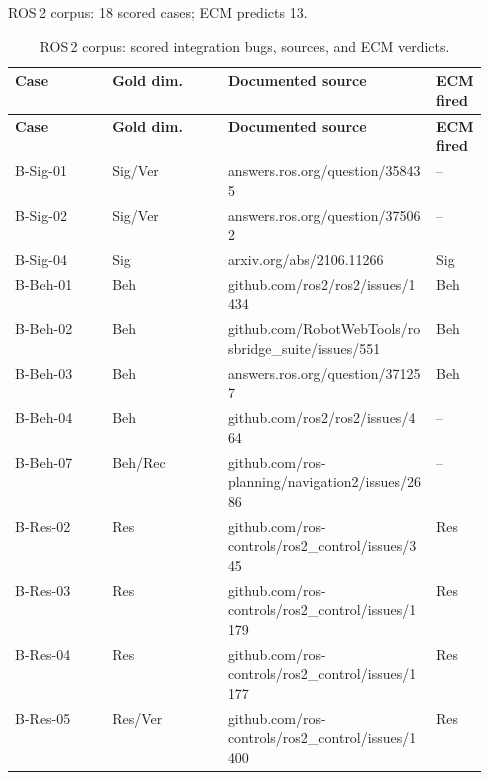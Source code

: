 \noindent ROS\,2 corpus: 18 scored cases; ECM predicts 13.
\begin{longtable}{@{}ll>{\raggedright\arraybackslash}p{0.44\linewidth}>{\raggedright\arraybackslash}p{0.11\linewidth}@{}}
\caption{ROS\,2 corpus: scored integration bugs, sources, and ECM verdicts.}\label{tab:ledger_corpus}\\
\toprule
\textbf{Case} & \textbf{Gold dim.} & \textbf{Documented source} & \textbf{ECM fired} \\
\midrule\endfirsthead
\toprule \textbf{Case} & \textbf{Gold dim.} & \textbf{Documented source} & \textbf{ECM fired} \\ \midrule\endhead
\bottomrule\endfoot
B-Sig-01 & Sig/Ver & {\scriptsize\ttfamily answers.ros.org/\allowbreak{}question/\allowbreak{}358435} & -- \\
B-Sig-02 & Sig/Ver & {\scriptsize\ttfamily answers.ros.org/\allowbreak{}question/\allowbreak{}375062} & -- \\
B-Sig-04 & Sig & {\scriptsize\ttfamily arxiv.org/\allowbreak{}abs/\allowbreak{}2106.11266} & Sig \\
B-Beh-01 & Beh & {\scriptsize\ttfamily github.com/\allowbreak{}ros2/\allowbreak{}ros2/\allowbreak{}issues/\allowbreak{}1434} & Beh \\
B-Beh-02 & Beh & {\scriptsize\ttfamily github.com/\allowbreak{}RobotWebTools/\allowbreak{}rosbridge\_suite/\allowbreak{}issues/\allowbreak{}551} & Beh \\
B-Beh-03 & Beh & {\scriptsize\ttfamily answers.ros.org/\allowbreak{}question/\allowbreak{}371257} & Beh \\
B-Beh-04 & Beh & {\scriptsize\ttfamily github.com/\allowbreak{}ros2/\allowbreak{}ros2/\allowbreak{}issues/\allowbreak{}464} & -- \\
B-Beh-07 & Beh/Rec & {\scriptsize\ttfamily github.com/\allowbreak{}ros-planning/\allowbreak{}navigation2/\allowbreak{}issues/\allowbreak{}2686} & -- \\
B-Res-02 & Res & {\scriptsize\ttfamily github.com/\allowbreak{}ros-controls/\allowbreak{}ros2\_control/\allowbreak{}issues/\allowbreak{}345} & Res \\
B-Res-03 & Res & {\scriptsize\ttfamily github.com/\allowbreak{}ros-controls/\allowbreak{}ros2\_control/\allowbreak{}issues/\allowbreak{}1179} & Res \\
B-Res-04 & Res & {\scriptsize\ttfamily github.com/\allowbreak{}ros-controls/\allowbreak{}ros2\_control/\allowbreak{}issues/\allowbreak{}1177} & Res \\
B-Res-05 & Res/Ver & {\scriptsize\ttfamily github.com/\allowbreak{}ros-controls/\allowbreak{}ros2\_control/\allowbreak{}issues/\allowbreak{}1400} & Res \\

\end{longtable}
